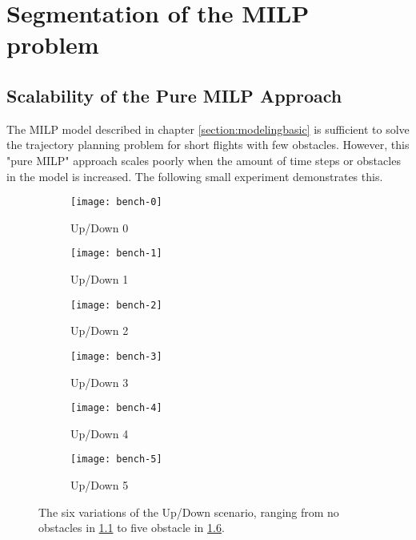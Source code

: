 \chapter{Segmentation of the MILP problem}
\label{section:segment}

\section{Scalability of the Pure MILP Approach}
The MILP model described in chapter \ref{section:modelingbasic} is sufficient to solve the trajectory planning problem for short flights with few obstacles. However, this "pure MILP" approach scales poorly when the amount of time steps or obstacles in the model is increased. The following small experiment demonstrates this.
\par
\begin{figure}[b]
	\centering
	\begin{subfigure}[t]{0.3\columnwidth}
        		\texttt{[image: bench-0]}
        		\caption{Up/Down 0}
        		 \label{fig:bench-0}
	\end{subfigure}	
	\hfill
	\begin{subfigure}[t]{0.3\columnwidth}
        		\texttt{[image: bench-1]}
        		\caption{Up/Down 1}
        		 \label{fig:bench-1}
	\end{subfigure}	
	\hfill
	\begin{subfigure}[t]{0.3\columnwidth}
        		\texttt{[image: bench-2]}
        		\caption{Up/Down 2}
        		 \label{fig:bench-2}
	\end{subfigure}
	\begin{subfigure}[t]{0.3\columnwidth}
        		\texttt{[image: bench-3]}
        		\caption{Up/Down 3}
        		 \label{fig:bench-3}
	\end{subfigure}	
	\hfill
	\begin{subfigure}[t]{0.3\columnwidth}
        		\texttt{[image: bench-4]}
        		\caption{Up/Down 4}
        		 \label{fig:bench-4}
	\end{subfigure}	
	\hfill
	\begin{subfigure}[t]{0.32\columnwidth}
        		\texttt{[image: bench-5]}
        		\caption{Up/Down 5}
        		 \label{fig:bench-5}
	\end{subfigure}		
	
			
	\caption[The six variations of the Up/Down scenario]{The six variations of the Up/Down scenario, ranging from no obstacles in \ref{fig:bench-0} to five obstacle in \ref{fig:bench-5}.}
    \label{fig:bench-pure}     
\end{figure}
